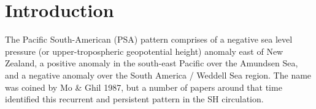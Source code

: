 \section{Introduction}

The Pacific South-American (PSA) pattern comprises of a negative sea level pressure (or upper-tropospheric geopotential height) anomaly east of New Zealand, a positive anomaly in the south-east Pacific over the Amundsen Sea, and a negative anomaly over the South America / Weddell Sea region. The name was coined by Mo & Ghil 1987, but a number of papers around that time identified this recurrent and persistent pattern in the SH circulation.
